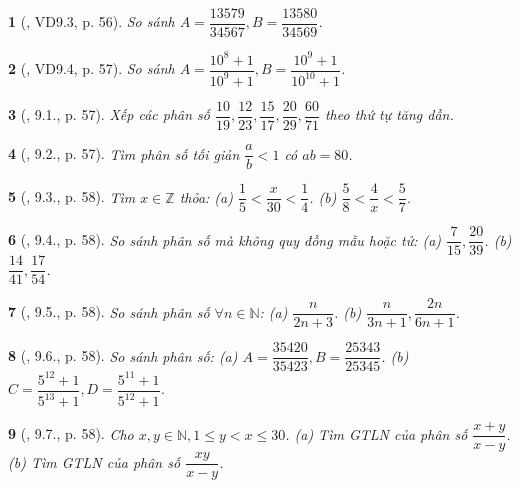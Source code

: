 \documentclass{article}
\newtheorem{baitoan}{}
\begin{document}
\begin{baitoan}[\cite{TLCT_THCS_Toan_6_so_hoc}, VD9.3, p. 56]
	So sánh $A = \dfrac{13579}{34567},B = \dfrac{13580}{34569}$.
\end{baitoan}

\begin{baitoan}[\cite{TLCT_THCS_Toan_6_so_hoc}, VD9.4, p. 57]
	So sánh $A = \dfrac{10^8 + 1}{10^9 + 1},B = \dfrac{10^9 + 1}{10^{10} + 1}$.
\end{baitoan}

\begin{baitoan}[\cite{TLCT_THCS_Toan_6_so_hoc}, 9.1., p. 57]
	Xếp các phân số $\dfrac{10}{19},\dfrac{12}{23},\dfrac{15}{17},\dfrac{20}{29},\dfrac{60}{71}$ theo thứ tự tăng dần.
\end{baitoan}

\begin{baitoan}[\cite{TLCT_THCS_Toan_6_so_hoc}, 9.2., p. 57]
	Tìm phân số tối giản $\dfrac{a}{b} < 1$ có $ab = 80$.
\end{baitoan}

\begin{baitoan}[\cite{TLCT_THCS_Toan_6_so_hoc}, 9.3., p. 58]
	Tìm $x\in\mathbb{Z}$ thỏa: (a) $\dfrac{1}{5} < \dfrac{x}{30} < \dfrac{1}{4}$. (b) $\dfrac{5}{8} < \dfrac{4}{x} < \dfrac{5}{7}$.
\end{baitoan}

\begin{baitoan}[\cite{TLCT_THCS_Toan_6_so_hoc}, 9.4., p. 58]
	So sánh phân số mà không quy đồng mẫu hoặc tử: (a) $\dfrac{7}{15},\dfrac{20}{39}$. (b) $\dfrac{14}{41},\dfrac{17}{54}$.
\end{baitoan}

\begin{baitoan}[\cite{TLCT_THCS_Toan_6_so_hoc}, 9.5., p. 58]
	So sánh phân số $\forall n\in\mathbb{N}$: (a) $\dfrac{n}{2n + 3}$. (b) $\dfrac{n}{3n + 1},\dfrac{2n}{6n + 1}$.
\end{baitoan}

\begin{baitoan}[\cite{TLCT_THCS_Toan_6_so_hoc}, 9.6., p. 58]
	So sánh phân số: (a) $A = \dfrac{35420}{35423},B = \dfrac{25343}{25345}$. (b) $C = \dfrac{5^{12} + 1}{5^{13} + 1},D = \dfrac{5^{11} + 1}{5^{12} + 1}$.
\end{baitoan}

\begin{baitoan}[\cite{TLCT_THCS_Toan_6_so_hoc}, 9.7., p. 58]
	Cho $x,y\in\mathbb{N},1\le y < x\le30$. (a) Tìm {\rm GTLN} của phân số $\dfrac{x + y}{x - y}$. (b) Tìm {\rm GTLN} của phân số $\dfrac{xy}{x - y}$.
\end{baitoan}
\end{document}
